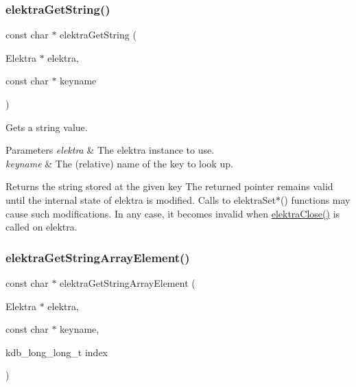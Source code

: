 \subsubsection{\texorpdfstring{elektraGetString()}{elektraGetString()}}
{\footnotesize\ttfamily const char $\ast$ elektra\+Get\+String (\begin{DoxyParamCaption}\item[{Elektra $\ast$}]{elektra,  }\item[{const char $\ast$}]{keyname }\end{DoxyParamCaption})}



Gets a string value. 


\begin{DoxyParams}{Parameters}
{\em elektra} & The elektra instance to use. \\
\hline
{\em keyname} & The (relative) name of the key to look up. \\
\hline
\end{DoxyParams}
\begin{DoxyReturn}{Returns}
the string stored at the given key The returned pointer remains valid until the internal state of {\ttfamily elektra} is modified. Calls to elektra\+Set$\ast$() functions may cause such modifications. In any case, it becomes invalid when \mbox{\hyperlink{group__highlevel_ga9b688b7250e5f9d8ea6701cc2cc269af}{elektra\+Close()}} is called on {\ttfamily elektra}. 
\end{DoxyReturn}
\mbox{\label{group__highlevel_gaf445216facccfc7ad6740b594e7a8f6e}} 
\subsubsection{\texorpdfstring{elektraGetStringArrayElement()}{elektraGetStringArrayElement()}}
{\footnotesize\ttfamily const char $\ast$ elektra\+Get\+String\+Array\+Element (\begin{DoxyParamCaption}\item[{Elektra $\ast$}]{elektra,  }\item[{const char $\ast$}]{keyname,  }\item[{kdb\+\_\+long\+\_\+long\+\_\+t}]{index }\end{DoxyParamCaption})}



